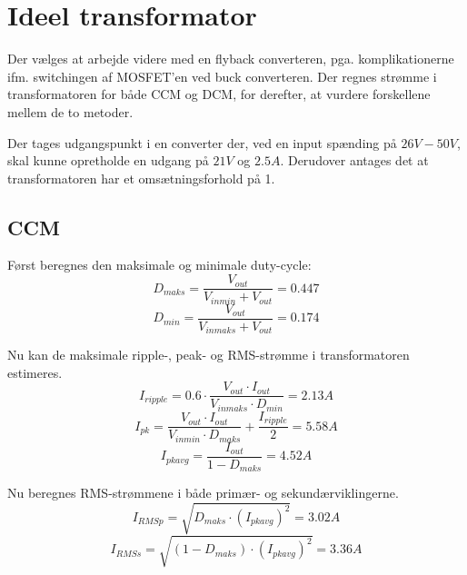 \section{Ideel transformator}
Der vælges at arbejde videre med en flyback converteren, pga. komplikationerne ifm. switchingen af MOSFET'en ved buck converteren.
Der regnes strømme i transformatoren for både CCM og DCM, for derefter, at vurdere forskellene mellem de to metoder.

Der tages udgangspunkt i en converter der, ved en input spænding på $26V-50V$, skal kunne opretholde en udgang på $21V$ og $2.5A$. Derudover antages det at transformatoren har et omsætningsforhold på 1.

\subsection{CCM}
Først beregnes den maksimale og minimale duty-cycle:
\begin{equation} \label{D_maks_CCM}
D_{maks} = \frac{V_{out}}{V_{inmin} + V_{out}} = 0.447
\end{equation}
\begin{equation} \label{D_min_CCM}
D_{min} = \frac{V_{out}}{V_{inmaks} + V_{out}} = 0.174
\end{equation}

\noindent Nu kan de maksimale ripple-, peak- og RMS-strømme i transformatoren estimeres. 
\begin{equation} \label{I_ripple_CCM}
I_{ripple} = 0.6 \cdot \frac{V_{out} \cdot I_{out}}{V_{inmaks} \cdot   D_{min}} = 2.13A
\end{equation}
\begin{equation} \label{I_pk_CCM}
I_{pk} = \frac{V_{out} \cdot I_{out}}{V_{inmin} \cdot D_{maks}} + \frac{I_{ripple}}{2} = 5.58A
\end{equation}
\begin{equation} \label{I_pk_avg_CCM}
I_{pkavg} = \frac{I_{out}}{1-D_{maks}} = 4.52A
\end{equation}

\noindent Nu beregnes RMS-strømmene i både primær- og sekundærviklingerne. 
\begin{equation} \label{I_p_RMS_CCM}
I_{RMSp} = \sqrt{D_{maks} \cdot (I_{pkavg})^2} = 3.02A
\end{equation}
\begin{equation} \label{I_s_RMS_CCM}
I_{RMSs} = \sqrt{(1-D_{maks}) \cdot (I_{pkavg})^2} = 3.36A
\end{equation}

